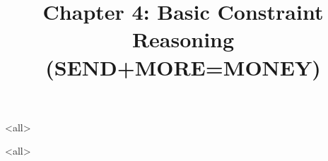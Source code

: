 \title[Basic Constraint Reasoning] %
{Chapter 4: Basic Constraint Reasoning (SEND+MORE=MONEY)}

\subtitle
{} %



\mode<all>{

}
\mode<all>{

}


